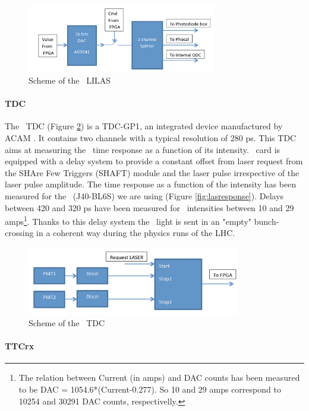 \begin{figure}[htbp]

\centering
\includegraphics[height=3cm]{figures/lilas.pdf}
\caption{Scheme of the \lascar~LILAS}\label{fig:laslascarlilas}
\end{figure}

\paragraph{TDC}
The \lascar~TDC (Figure \ref{fig:laslascartdc}) is a TDC-GP1, an integrated device manufactured by ACAM \cite{ref:tdc}. It contains two channels with a typical resolution of 280 ps. This TDC aims at measuring the \las~time response as a function of its intensity. \lascar~card is equipped with a delay system to provide a constant offset from laser request from the SHAre Few Triggers (SHAFT) module and the laser pulse irrespective of the laser pulse amplitude. The time response as a function of the intensity has been measured for the \las~(J40-BL6S) we are using (Figure \ref{fig:lasresponse}). Delays between 420 and 320 ps have been measured for \laser~intensities between 10 and 29 amps\footnote{The relation between Current (in amps) and DAC counts has been measured to be DAC = 1054.6*(Current-0.277). So 10 and 29 amps correspond to 10254 and 30291 DAC counts, respectivelly.}. Thanks to this delay system the \las~light is sent in an "empty" bunch-crossing in a coherent way during the physics runs of the LHC.

\begin{figure}[htbp]

\centering
\includegraphics[height=3cm]{figures/tdc.pdf}
\caption{Scheme of the \lascar~TDC}\label{fig:laslascartdc}
\end{figure}

\paragraph{TTCrx}

